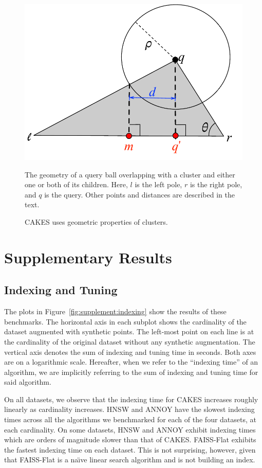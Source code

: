 \documentclass{article}
\begin{document}
\begin{figure}
    \centering
    \includegraphics[scale=0.75]{images/geometry/overlapping-children-3.pdf}
    \caption{The geometry of a query ball overlapping with a cluster and either one or both of its children. Here, $l$ is the left pole, $r$ is the right pole, and $q$ is the query. Other points and distances are described in the text.}
    \label{fig:supplement:overlapping-children}
    \caption{CAKES uses geometric properties of clusters.}
\end{figure}


\section{Supplementary Results}

\subsection{Indexing and Tuning}

The plots in Figure~\ref{fig:supplement:indexing} show the results of these benchmarks.
The horizontal axis in each subplot shows the cardinality of the dataset augmented with synthetic points.
The left-most point on each line is at the cardinality of the original dataset without any synthetic augmentation.
The vertical axis denotes the sum of indexing and tuning time in seconds.
Both axes are on a logarithmic scale.
Hereafter, when we refer to the ``indexing time'' of an algorithm, we are implicitly referring to the sum of indexing and tuning time for said algorithm.

On all datasets, we observe that the indexing time for CAKES increases roughly linearly as cardinality increases.
HNSW and ANNOY have the slowest indexing times across all the algorithms we benchmarked for each of the four datasets, at each cardinality.
On some datasets, HNSW and ANNOY exhibit indexing times which are orders of magnitude slower than that of CAKES.
FAISS-Flat exhibits the fastest indexing time on each dataset.
This is not surprising, however, given that FAISS-Flat is a na\"{\i}ve linear search algorithm and is not building an index.
\end{document}
